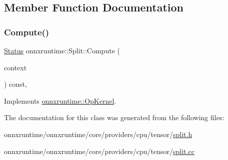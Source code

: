 \subsection{Member Function Documentation}
\mbox{\label{classonnxruntime_1_1Split_ae059546d2b4177502aba420a52865d4f}} 
\subsubsection{\texorpdfstring{Compute()}{Compute()}}
{\footnotesize\ttfamily \mbox{\hyperlink{classonnxruntime_1_1common_1_1Status}{Status}} onnxruntime\+::\+Split\+::\+Compute (\begin{DoxyParamCaption}\item[{\mbox{\hyperlink{classonnxruntime_1_1OpKernelContext}{Op\+Kernel\+Context}} $\ast$}]{context }\end{DoxyParamCaption}) const\hspace{0.3cm}{\ttfamily [override]}, {\ttfamily [virtual]}}



Implements \mbox{\hyperlink{classonnxruntime_1_1OpKernel_a9eca8656a78b1b3ab9d3351a12798650}{onnxruntime\+::\+Op\+Kernel}}.



The documentation for this class was generated from the following files\+:\begin{DoxyCompactItemize}
\item 
onnxruntime/onnxruntime/core/providers/cpu/tensor/\mbox{\hyperlink{split_8h}{split.\+h}}\item 
onnxruntime/onnxruntime/core/providers/cpu/tensor/\mbox{\hyperlink{split_8cc}{split.\+cc}}\end{DoxyCompactItemize}
